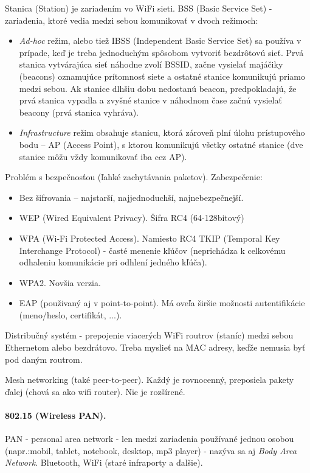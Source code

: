 {{Stanica (Station) je zariadením vo WiFi sieti. BSS (Basic Service Set) - zariadenia, ktoré vedia medzi sebou komunikovať v dvoch režimoch:
\begin{itemize}
\item \emph{Ad-hoc} režim, alebo tiež IBSS (Independent Basic Service Set) sa používa v prípade, keď je treba jednoduchým spôsobom vytvoriť bezdrôtovú sieť. Prvá stanica vytvárajúca sieť náhodne zvolí BSSID, začne vysielať majáčiky (beacons) oznamujúce prítomnosť siete a ostatné stanice komunikujú priamo medzi sebou. Ak stanice dlhšiu dobu nedostanú beacon, predpokladajú, že prvá stanica vypadla a zvyšné stanice v náhodnom čase začnú vysielať beacony (prvá stanica vyhráva).
\item \emph{Infrastructure} režim obsahuje stanicu, ktorá zároveň plní úlohu prístupového bodu -- AP (Access Point), s ktorou komunikujú všetky ostatné stanice (dve stanice môžu vždy komunikovať iba cez AP).
\end{itemize}
     
Problém s bezpečnosťou (ľahké zachytávania paketov). Zabezpečenie: 
\begin{itemize}                                                 
\item Bez šifrovania -- najstarší, najjednoduchší, najnebezpečnejší.
\item WEP (Wired Equivalent Privacy). Šifra RC4 (64-128bitový)        
\item WPA (Wi-Fi Protected Access). Namiesto RC4 TKIP (Temporal Key Interchange Protocol) - časté menenie kľúčov (neprichádza k celkovému odhaleniu komunikácie pri odhlení jedného kľúča).
\item WPA2. Novšia verzia. 
\item EAP (použivaný aj v point-to-point). Má oveľa širšie možnosti autentifikácie (meno/heslo, certifikát, ...).
\end{itemize}
      
Distribučný systém - prepojenie viacerých WiFi routrov (staníc) medzi sebou Ethernetom alebo bezdrátovo. Treba myslieť na MAC adresy, keďže nemusia byť pod daným routrom. 

Mesh networking (také peer-to-peer). Každý je rovnocenný, preposiela pakety ďalej (chová sa ako wifi router). Nie je rozšírené. 
      
\paragraph{802.15 (Wireless PAN).} 
PAN - personal area network - len medzi zariadenia používané jednou osobou (napr.:mobil, tablet, notebook, desktop, mp3 player) - nazýva sa aj \emph{Body Area Network}.
Bluetooth, WiFi (staré infraporty a ďalšie). 
}}
